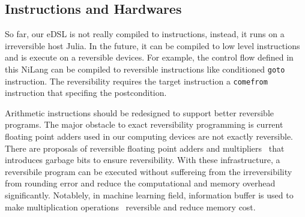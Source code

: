 \documentclass[aps,twocolumn,longbibliography,english,superscriptaddress,prr]{revtex4-1}
\newcommand{\<}{\langle}
\renewcommand{\>}{\rangle}
\theoremstyle{definition}\newtheorem{definition}{\textit{Definition}}
\begin{document}

\subsection{Instructions and Hardwares}\label{sec:hardware}
So far, our eDSL is not really compiled to instructions, instead, it runs on a irreversible host Julia.
In the future, it can be compiled to low level instructions and is execute on a reversible devices.
For example, the control flow defined in this NiLang can be compiled to reversible instructions like conditioned \texttt{goto} instruction.
The reversibility requires the target instruction a \texttt{comefrom} instruction that specifing the postcondition. ~\cite{Vieri1999}

Arithmetic instructions should be redesigned to support better reversible programs.
The major obstacle to exact reversibility programming is current floating point adders used in our computing devices are not exactly reversible.
There are proposals of reversible floating point adders and multipliers~\cite{Nachtigal2010,Nachtigal2011,Nguyen2013,Hner2018} that introduces garbage bits to ensure reversibility.
With these infrastructure, a reversibile program can be executed without suffereing from the irreversibility from rounding error and reduce the computational and memory overhead significantly.
Notablely, in machine learning field, information buffer is used to make multiplication operations~\cite{Maclaurin2015} reversible and reduce memory cost.
\end{document}
